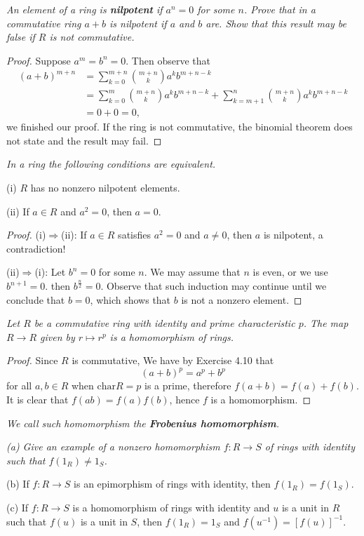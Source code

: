 \begin{problem}\em
An element of a ring is \textbf{nilpotent} if $a^n=0$ for some $n$. Prove that in a commutative ring $a+b$ is nilpotent if $a$ and $b$ are. Show that this result may be false if $R$ is not commutative.
\end{problem}
\begin{proof}
Suppose $a^m=b^n=0$. Then observe that 
$$
\begin{aligned}
(a+b)^{m+n}&=\sum_{k=0}^{m+n}\binom{m+n}{k}a^kb^{m+n-k}\\
&=\sum_{k=0}^m\binom{m+n}{k}a^kb^{m+n-k}+\sum_{k=m+1}^n\binom{m+n}{k}a^kb^{m+n-k}\\
&=0+0=0,
\end{aligned}
$$
we finished our proof. If the ring is not commutative, the binomial theorem does not state and the result may fail.
\end{proof}
\begin{problem}\em
In a ring the following conditions are equivalent.\par
(i) $R$ has no nonzero nilpotent elements.\par
(ii) If $a\in R$ and $a^2=0$, then $a=0$.
\end{problem}
\begin{proof}
(i)$\Rightarrow$(ii): If $a\in R$ satisfies $a^2=0$ and $a\ne 0$, then $a$ is nilpotent, a contradiction!\par
(ii)$\Rightarrow$(i): Let $b^n=0$ for some $n$. We may assume that $n$ is even, or we use $b^{n+1}=0$. then $b^{\frac{n}{2}}=0$. Observe that such induction may continue until we conclude that $b=0$, which shows that $b$ is not a nonzero element.
\end{proof}
\begin{problem}\em
Let $R$ be a commutative ring with identity and prime characteristic $p$. The map $R\to R$ given by $r\mapsto r^p$ is a homomorphism of rings.
\end{problem}
\begin{proof}
Since $R$ is commutative, We have by Exercise 4.10 that 
$$
\left( a+b \right) ^p=a^p+b^p
$$
for all $a,b\in R$ when $\mathrm{char}R=p$ is a prime, therefore $f(a+b)=f(a)+f(b)$. It is clear that $f(ab)=f(a)f(b)$, hence $f$ is a homomorphism.
\end{proof}
\begin{note}\em
We call such homomorphism the \textbf{Frobenius homomorphism}.
\end{note}
\begin{problem}\em
(a) Give an example of a nonzero homomorphism $f:R\to S$ of rings with identity such that $f(1_R)\ne 1_S$.\par
(b) If $f:R\to S$ is an epimorphism of rings with identity, then $f(1_R)=f(1_S)$.\par
(c) If $f:R\to S$ is a homomorphism of rings with identity and $u$ is a unit in $R$ such that $f(u)$ is a unit in $S$, then $f(1_R)=1_S$ and $f(u^{-1})=[f(u)]^{-1}$.
\end{problem}
